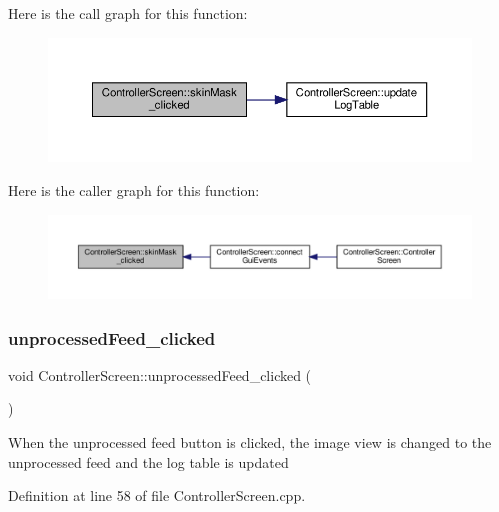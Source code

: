 Here is the call graph for this function\+:
\nopagebreak
\begin{figure}[H]
\begin{center}
\leavevmode
\includegraphics[width=350pt]{class_controller_screen_a4d9db4a832f667aacb7d7532f752fd1b_cgraph}
\end{center}
\end{figure}
Here is the caller graph for this function\+:
\nopagebreak
\begin{figure}[H]
\begin{center}
\leavevmode
\includegraphics[width=350pt]{class_controller_screen_a4d9db4a832f667aacb7d7532f752fd1b_icgraph}
\end{center}
\end{figure}
\mbox{\label{class_controller_screen_aac8b2856372fa02c4f793cf9183dffed}} 
\subsubsection{\texorpdfstring{unprocessed\+Feed\+\_\+clicked}{unprocessedFeed\_clicked}}
{\footnotesize\ttfamily void Controller\+Screen\+::unprocessed\+Feed\+\_\+clicked (\begin{DoxyParamCaption}{ }\end{DoxyParamCaption})\hspace{0.3cm}{\ttfamily [slot]}}

When the unprocessed feed button is clicked, the image view is changed to the unprocessed feed and the log table is updated 

Definition at line 58 of file Controller\+Screen.\+cpp.

